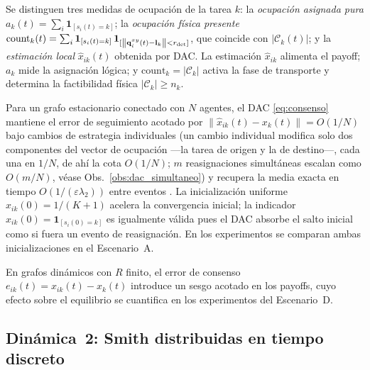 Se distinguen tres medidas de ocupación de la tarea $k$: la \emph{ocupación
asignada pura} $a_k(t) = \sum_i \mathbf{1}_{[s_i(t)=k]}$; la \emph{ocupación física
presente} $\mathrm{count}_k(t) = \sum_i \mathbf{1}_{[s_i(t)=k]}\,
\mathbf{1}_{[\left\|\mathbf{q}_i^{xy}(t)-\mathbf{l}_k\right\|<r_{\mathrm{det}}]}$, que coincide
con $|\mathcal{C}_k(t)|$; y la \emph{estimación local} $\hat{x}_{ik}(t)$ obtenida por
DAC. La estimación $\hat{x}_{ik}$ alimenta el payoff; $a_k$ mide la asignación lógica;
y $\mathrm{count}_k = |\mathcal{C}_k|$ activa la fase de transporte y determina la
factibilidad física $|\mathcal{C}_k| \geq n_k$.

\begin{observacion}
\label{obs:init_obs}
Para un grafo estacionario conectado con $N$ agentes, el DAC \eqref{eq:consenso}
mantiene el error de seguimiento acotado por $\|\hat{x}_{ik}(t) - x_k(t)\| = O(1/N)$
bajo cambios de estrategia individuales (un cambio individual modifica solo dos
componentes del vector de ocupación —la tarea de origen y la de destino—, cada una en
$1/N$, de ahí la cota $O(1/N)$; $m$ reasignaciones simultáneas escalan como $O(m/N)$,
véase Obs.~\ref{obs:dac_simultaneo}) y recupera la media exacta en tiempo
$O(1/(\varepsilon\lambda_2))$ entre eventos \citep{kia2019tutorial}.
La inicialización uniforme $\hat{x}_{ik}(0) = 1/(K+1)$ acelera la convergencia inicial;
la indicador $\hat{x}_{ik}(0) = \mathbf{1}_{[s_i(0)=k]}$ es igualmente válida
pues el DAC absorbe el salto inicial como si fuera un evento de reasignación.
En los experimentos se comparan ambas inicializaciones en el Escenario~A.
\end{observacion}
En grafos dinámicos con $R$ finito, el error de consenso $e_{ik}(t) = \hat{x}_{ik}(t)
- x_k(t)$ introduce un sesgo acotado en los payoffs, cuyo efecto sobre el equilibrio
se cuantifica en los experimentos del Escenario~D.

\subsection{Dinámica~2: Smith distribuidas en tiempo discreto}
\label{subsec:smith}


